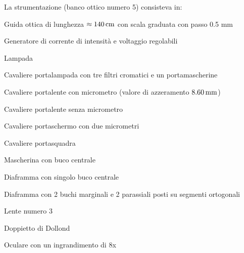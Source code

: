 La strumentazione (banco ottico numero 5) consisteva in:
\begin{compactitem}
\item Guida ottica di lunghezza $\approx 140 \,\mathrm{cm}$ con scala graduata con passo 0.5 mm
\item Generatore di corrente di intensità e voltaggio regolabili
\item Lampada 
\item Cavaliere portalampada con tre filtri cromatici e un portamascherine
\item Cavaliere portalente con micrometro (valore di azzeramento $8.60 \,\mathrm{mm}$)
\item Cavaliere portalente senza micrometro
\item Cavaliere portaschermo con due micrometri
\item Cavaliere portasquadra
\item Mascherina con buco centrale
\item Diaframma con singolo buco centrale
\item Diaframma con 2 buchi marginali e 2 parassiali posti su segmenti ortogonali
\item Lente numero 3
\item Doppietto di Dollond
\item Oculare con un ingrandimento di 8x
\end{compactitem}
